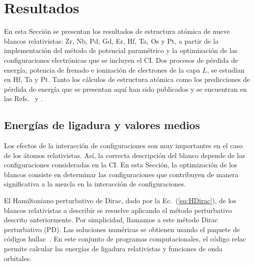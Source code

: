 \section{Resultados}
\label{sec:results-heavy}

En esta Sección se presentan los resultados de estructura atómica de 
nueve blancos relativistas: Zr, Nb, Pd, Gd, Er, Hf, Ta, Os y Pt, a 
partir de la implementación del método de potencial paramétrico y la
optimización de las configuraciones electrónicas que se incluyen el CI.
Dos procesos de pérdida de energía, potencia de frenado e ionización de 
electrones de la capa $L$, se estudian en Hf, Ta y Pt. Tanto los 
cálculos de estructura atómica como los predicciones de pérdida de 
energía que se presentan aquí han sido publicados y se encuentran en las 
Refs.~\cite{Mendez:19relat} y \cite{Montanari:20,Oswald:20}.

\subsection{Energías de ligadura y valores medios}
\label{subsec:results-target}

Los efectos de la interacción de configuraciones son muy importantes en 
el caso de los átomos relativistas. Así, la correcta descripción del 
blanco depende de las configuraciones consideradas en la CI. En esta 
Sección, la optimización de los blancos consiste en determinar las 
configuraciones que contribuyen de manera significativa a la mezcla en 
la interacción de configuraciones. 

El Hamiltoniano perturbativo de Dirac, dado por la Ec.~(\ref{eq:HDirac}), 
de los blancos relativistas a describir se resuelve aplicando el método 
perturbativo descrito anteriormente. Por simplicidad, llamamos a este 
método Dirac perturbativo (PD). Las soluciones numéricas se obtienen 
usando el paquete de códigos {\sc hullac}~\cite{BarShalom:01}. En este 
conjunto de programas computacionales, el código {\sc relac} permite 
calcular las energías de ligadura relativistas y funciones de onda 
orbitales.

